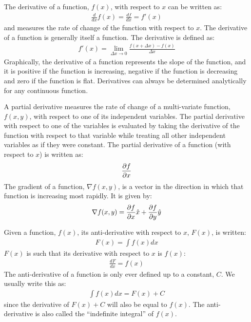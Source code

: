 \begin{chapterSummary}
The derivative of a function, $f(x)$, with respect to $x$ can be written as:
\begin{align*}
\frac{d}{dx} f(x)=\frac{df}{dx}=f'(x)
\end{align*}
and measures the rate of change of the function with respect to $x$. The derivative of a function is generally itself a function. The derivative is defined as:
\begin{align*}
f'(x) = \lim_{\Delta x \to 0}\frac{f(x+\Delta x)-f(x)}{\Delta x}
\end{align*}
Graphically, the derivative of a function represents the slope of the function, and it is positive if the function is increasing, negative if the function is decreasing and zero if the function is flat.  Derivatives can always be determined analytically for any continuous function.

A partial derivative measures the rate of change of a multi-variate function, $f(x,y)$, with respect to one of its independent variables. The partial derivative with respect to one of the variables is evaluated by taking the derivative of the function with respect to that variable while treating all other independent variables as if they were constant. The partial derivative of a function (with respect to $x$) is written as:
\begin{align*}
\frac{\partial f}{\partial x}
\end{align*}
The gradient of a function, $\nabla f(x,y)$, is a vector in the direction in which that function is increasing most rapidly. It is given by:
\begin{align*}
\nabla f(x,y)=\frac{\partial f}{\partial x}\hat x + \frac{\partial f}{\partial y} \hat y
\end{align*}

Given a function, $f(x)$, its anti-derivative with respect to $x$, $F(x)$, is written:
\begin{align*}
F(x) = \int f(x) dx
\end{align*}
$F(x)$ is such that its derivative with respect to $x$ is $f(x)$:
\begin{align*}
\frac{dF}{dx}=f(x)
\end{align*}
The anti-derivative of a function is only ever defined up to a constant, $C$. We usually write this as:
\begin{align*}
\int f(x) dx = F(x) + C
\end{align*}
since the derivative of $F(x) +C$ will also be equal to $f(x)$. The anti-derivative is also called the ``indefinite integral'' of $f(x)$. 


\end{chapterSummary}
